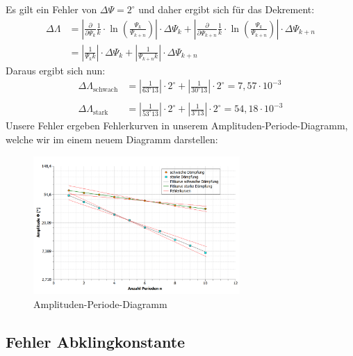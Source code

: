 \documentclass[fontsize=12pt]{scrartcl}
\renewcommand{\l}{\left\vert}
\renewcommand{\r}{\right\vert}
\begin{document}
Es gilt ein Fehler von $\Delta \Psi=2^{\circ}$ und daher ergibt sich für das Dekrement:
\begin{align*}
\Delta \Lambda &= \l\frac{\partial}{\partial \Psi_{k}} \frac{1}{k} \cdot \ln(\frac{\Psi_k}{\Psi_{k+n}}) \r  \cdot \Delta\Psi_{k}+  \l\frac{\partial}{\partial \Psi_{k+n}} \frac{1}{k} \cdot \ln(\frac{\Psi_k}{\Psi_{k+n}}) \r\cdot \Delta\Psi_{k+n} \\
&=  \l \frac{1}{\Psi_k k}  \r  \cdot \Delta\Psi_{k}+  \l\frac{1}{\Psi_{k+n}k}\r \cdot \Delta\Psi_{k+n}
\end{align*}
Daraus ergibt sich nun:
\begin{align*}
\Delta \Lambda_{\text{schwach}} &=  \l \frac{1}{63^{\circ} 13}  \r  \cdot 2^{\circ}+  \l \frac{1}{30^{\circ}13}\r \cdot 2^{\circ}= 7,57 \cdot 10^{-3}\\
~\\
\Delta \Lambda_{\text{stark}} &=  \l \frac{1}{53^{\circ} 13}  \r  \cdot 2^{\circ}+  \l \frac{1}{3^{\circ}13}\r \cdot 2^{\circ}= 54,18 \cdot 10^{-3}
\end{align*}
Unsere Fehler ergeben Fehlerkurven in unserem Amplituden-Periode-Diagramm, welche wir im einem neuem Diagramm darstellen:
\begin{figure}[H]
\centering
\vspace{-10pt}
                \includegraphics[width=0.7\textwidth]{Graphik/fehler}
                \caption{Amplituden-Periode-Diagramm}
                \label{9}
\end{figure}
\vspace{-10pt}

\subsection{Fehler Abklingkonstante}
\end{document}

